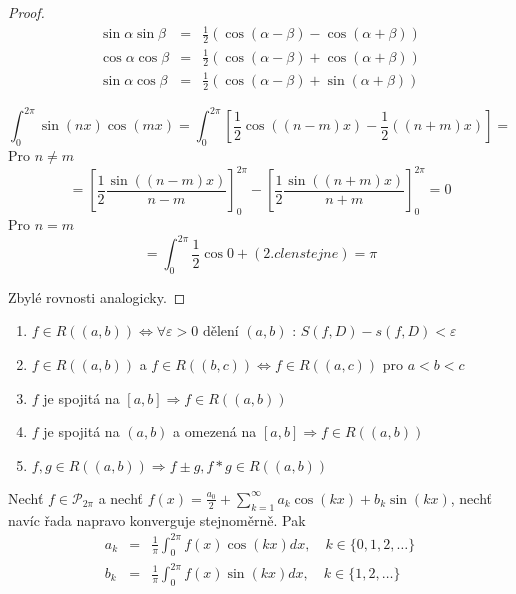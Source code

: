 \begin{proof}

\begin{eqnarray}
\sin \alpha \sin \beta & = & \frac{1}{2} \left( \cos (\alpha - \beta) - \cos (\alpha + \beta) \right) \nonumber\\
\cos \alpha \cos \beta & = & \frac{1}{2} \left( \cos (\alpha - \beta) + \cos (\alpha + \beta) \right) \nonumber\\
\sin \alpha \cos \beta & = & \frac{1}{2} \left( \cos (\alpha - \beta) + \sin (\alpha + \beta) \right) \nonumber
\end{eqnarray}

$$\int_{0}^{2 \pi} \sin (nx) \cos(mx) = \int_{0}^{2 \pi} \left[ \frac{1}{2} \cos \left( (n-m)x \right) - \frac{1}{2} \left( (n+m)x \right) \right] = $$
Pro $n \neq m$
$$= \left[ \frac{1}{2} \frac{\sin \left( (n-m)x \right)}{n-m} \right]_{0}^{2 \pi} - \left[ \frac{1}{2} \frac{\sin \left( (n+m)x \right)}{n+m} \right]_{0}^{2 \pi} = 0$$
Pro $n=m$
$$=\int_{0}^{2 \pi} \frac{1}{2} \cos 0 + (2. clen stejne) = \pi$$

Zbylé rovnosti analogicky.
\end{proof}\begin{opakovani} \quad
\begin{enumerate}
\item $f \in R((a,b)) \Leftrightarrow \forall \varepsilon > 0 \textrm{ dělení } (a,b)$ : $S(f,D) -s(f,D) < \varepsilon$
\item $f \in R((a,b))$ a $f \in R((b,c)) \Leftrightarrow f \in R((a,c))$ pro $a<b<c$
\item $f$ je spojitá na $[a,b] \Rightarrow f \in R((a,b))$
\item $f$ je spojitá na $(a,b)$ a omezená na $[a,b] \Rightarrow f \in R((a,b))$
\item $f, g \in R((a,b)) \Rightarrow f \pm g, f * g \in R((a,b))$
\end{enumerate}
\end{opakovani}

\begin{vetal}
Nechť $f \in \mathcal{P}_{2 \pi}$ a nechť $f(x) = \frac{a_0}{2} + \sum_{k=1}^{\infty} a_k \cos(kx) + b_k \sin(kx)$, nechť navíc řada napravo konverguje stejnoměrně. Pak
\begin{eqnarray}
a_k & = & \frac{1}{\pi} \int_0^{2 \pi} f(x) \cos(kx) dx, \quad k \in \{0, 1, 2, \ldots\} \nonumber\\
b_k & = & \frac{1}{\pi} \int_0^{2 \pi} f(x) \sin(kx) dx, \quad k \in \{1, 2, \ldots\} \nonumber
\end{eqnarray}
\end{vetal}

